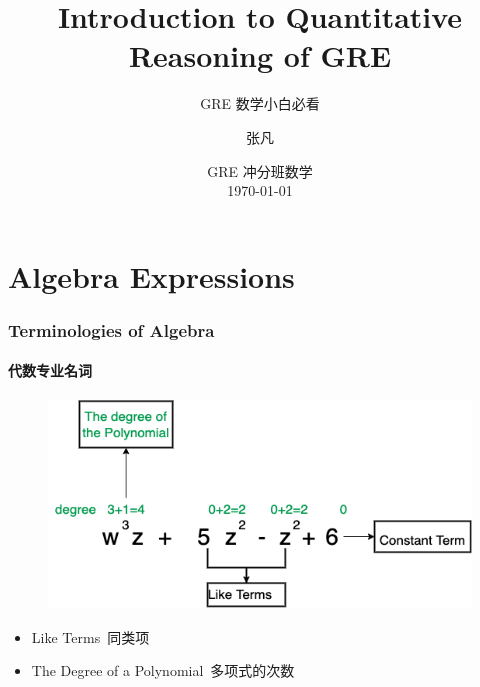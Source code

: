 \documentclass[
	11pt, %
]{beamer}
\title[Into to QR]{Introduction to Quantitative Reasoning of GRE} %
\subtitle{GRE 数学小白必看} %
\author[张凡]{张凡} %
\institute[XDF]{新东方国际教育 \\ \smallskip \textit{zhangfan@xdf.cn}} %
\date[\today]{GRE 冲分班数学 \\ \today} %
\begin{document}

\begin{frame}
	\titlepage %
\end{frame}






\section{Algebra Expressions}


\begin{frame}
	\frametitle{Terminologies of Algebra}
	\framesubtitle{代数专业名词}
	
			\begin{figure}
				\includegraphics[width=0.8\linewidth]{Polynomial.png}
			\end{figure}
			\begin{itemize}
				\item Like Terms\ 同类项
				\item The Degree of a Polynomial\ 多项式的次数
			\end{itemize}
\end{frame}

\end{document}
